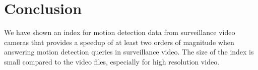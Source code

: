 \begin{comment}
\begin{table}
    \caption{Index size comparison for students scenario, for different histogram packing strategies and frames stored per file}\label{res:frames-packing}
	\centering
    \begin{tabular}{ r rrrr }
		~ & \multicolumn{4}{c}{\textbf{Index Size (MB) / Packing Strategy}} \\
		\cline{2-5}
	    \textbf{Frames/file} & \texttt{linear} & \texttt{binned} & \texttt{reg-linear} & \texttt{reg-binned} \\  \hline\noalign{\smallskip}
		1   		& 5.5 & 7.8 & 5.5 & 5.5         \\
	    4			& 5.5 & 7.8 & 5.4 & 6.3         \\
	    16     		& 5.5 & 8.9 & 5.3 & 6.5         \\\noalign{\smallskip}
        \hline
	   \end{tabular}
\end{table}
\end{comment}


\section{Conclusion}
We have shown an index for motion detection data from surveillance video cameras that provides a speedup of at least two orders of magnitude when answering motion detection queries in surveillance video. The size of the index is small compared to the video files, especially for high resolution video.


%
%

